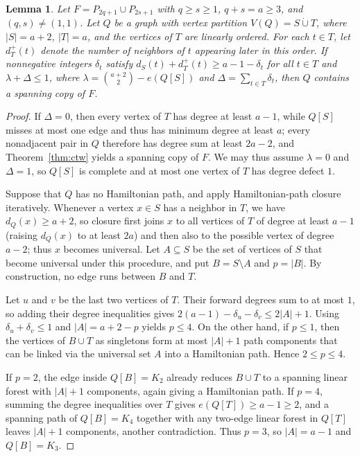 \documentclass[10pt]{article}
\theoremstyle{compactplain}
\newtheorem{lemma}[theorem]{Lemma}
\theoremstyle{remark}\newtheorem{remark}[theorem]{Remark}
\begin{document}
\begin{lemma}\label{lem:two-odd-defect}
Let $F=P_{2q+1}\cup P_{2s+1}$ with $q\ge s\ge1$, $q+s=a\ge3$, and
$(q,s)\ne(1,1)$. Let $Q$ be a graph with vertex partition
$V(Q)=S\dot\cup T$, where $|S|=a+2$, $|T|=a$, and the vertices of $T$
are linearly ordered. For each $t\in T$, let $d_T^+(t)$ denote the
number of neighbors of $t$ appearing later in this order. If nonnegative
integers $\delta_t$ satisfy $d_S(t)+d_T^+(t)\ge a-1-\delta_t$ for all
$t\in T$ and $\lambda+\Delta\le1$, where
$\lambda=\binom{a+2}{2}-e(Q[S])$ and $\Delta=\sum_{t\in T}\delta_t$,
then $Q$ contains a spanning copy of $F$.
\end{lemma}
\begin{proof}
If $\Delta=0$, then every vertex of $T$ has degree at least $a-1$, while
$Q[S]$ misses at most one edge and thus has minimum degree at least $a$;
every nonadjacent pair in $Q$ therefore has degree sum at least $2a-2$,
and Theorem~\ref{thm:ctw} yields a spanning copy of $F$. We may thus
assume $\lambda=0$ and $\Delta=1$, so $Q[S]$ is complete and at most one
vertex of $T$ has degree defect $1$.

Suppose that $Q$ has no Hamiltonian path, and apply Hamiltonian-path
closure iteratively. Whenever a vertex $x\in S$ has a neighbor in $T$,
we have $d_Q(x)\ge a+2$, so closure first joins $x$ to all vertices of
$T$ of degree at least $a-1$ (raising $d_Q(x)$ to at least $2a$) and
then also to the possible vertex of degree $a-2$; thus $x$ becomes
universal. Let $A\subseteq S$ be the set of vertices of $S$ that become
universal under this procedure, and put $B=S\setminus A$ and $p=|B|$. By
construction, no edge runs between $B$ and $T$.

Let $u$ and $v$ be the last two vertices of $T$. Their forward degrees
sum to at most $1$, so adding their degree inequalities gives
$2(a-1)-\delta_u-\delta_v\le2|A|+1$. Using $\delta_u+\delta_v\le1$ and
$|A|=a+2-p$ yields $p\le4$. On the other hand, if $p\le1$, then the
vertices of $B\cup T$ as singletons form at most $|A|+1$ path components
that can be linked via the universal set $A$ into a Hamiltonian path.
Hence $2\le p\le4$.

If $p=2$, the edge inside $Q[B]=K_2$ already reduces $B\cup T$ to a
spanning linear forest with $|A|+1$ components, again giving a
Hamiltonian path. If $p=4$, summing the degree inequalities over $T$
gives $e(Q[T])\ge a-1\ge2$, and a spanning path of $Q[B]=K_4$ together
with any two-edge linear forest in $Q[T]$ leaves $|A|+1$ components,
another contradiction. Thus $p=3$, so $|A|=a-1$ and $Q[B]=K_3$.


\end{proof}
\end{document}
